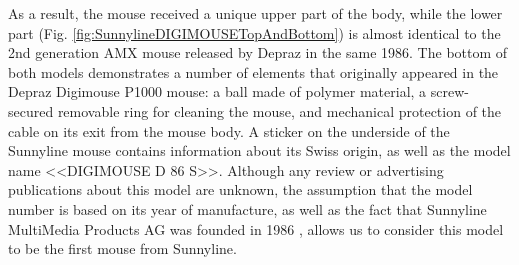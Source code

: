 \documentclass[11pt, a4paper]{article}
\begin{document}
As a result, the mouse received a unique upper part of the body, while the lower part (Fig. \ref{fig:SunnylineDIGIMOUSETopAndBottom}) is almost identical to the 2nd generation AMX mouse released by Depraz in the same 1986.
The bottom of both models demonstrates a number of elements that originally appeared in the Depraz Digimouse P1000 mouse: a ball made of polymer material, a screw-secured removable ring for cleaning the mouse, and mechanical protection of the cable on its exit from the mouse body. A sticker on the underside of the Sunnyline mouse contains information about its Swiss origin, as well as the model name <<DIGIMOUSE D 86 S>>. Although any review or advertising publications about this model are unknown, the assumption that the model number is based on its year of manufacture, as well as the fact that Sunnyline MultiMedia Products AG was founded in 1986 \cite{Sunnyline}, allows us to consider this model to be the first mouse from Sunnyline.
\end{document}

